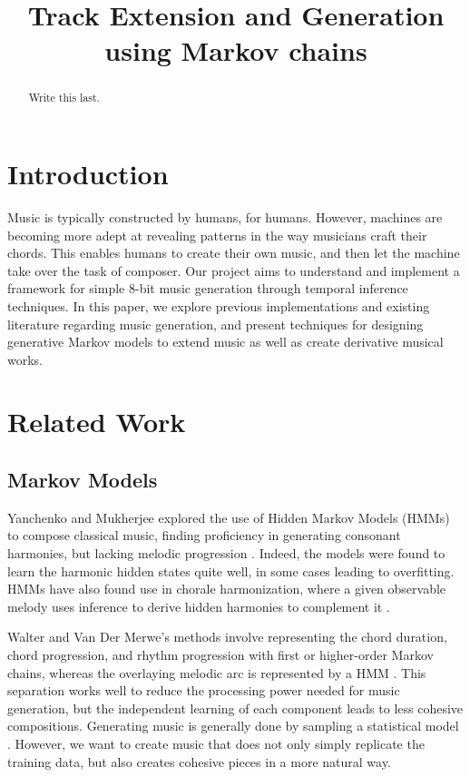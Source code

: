 \documentclass{article}
\title{Track Extension and Generation using Markov chains}
\begin{document}
\maketitle

\begin{abstract}
Write this last.
\end{abstract}

\section{Introduction}
Music is typically constructed by humans, for humans. However, machines are becoming more adept at revealing patterns in the way musicians craft their chords. 
This enables humans to create their own music, and then let the machine take over the task of composer. Our project aims to understand and implement a framework 
for simple 8-bit music generation through temporal inference techniques. In this paper, we explore previous implementations and existing literature regarding music 
generation, and present techniques for designing generative Markov models to extend music as well as create derivative musical works.

\section{Related Work}
\subsection{Markov Models}
Yanchenko and Mukherjee explored the use of Hidden Markov Models (HMMs) to compose classical music, finding proficiency in generating consonant harmonies, but 
lacking melodic progression \cite{yanchenko_2017}. Indeed, the models were found to learn the harmonic hidden states quite well, in some cases leading to overfitting. 
HMMs have also found use in chorale harmonization, where a given observable melody uses inference to derive hidden harmonies to complement it \cite{allan_2005}. 

Walter and Van Der Merwe's methods involve representing the chord duration, chord progression, and rhythm progression with first or higher-order Markov chains, whereas 
the overlaying melodic arc is represented by a HMM \cite{walter_2011}. This separation works well to reduce the processing power needed for music generation, but the 
independent learning of each component leads to less cohesive compositions. Generating music is generally done by sampling a statistical model \cite{conklin_2003}.
However, we want to create music that does not only simply replicate the training data, but also creates cohesive pieces in a more natural way. 
\end{document}
